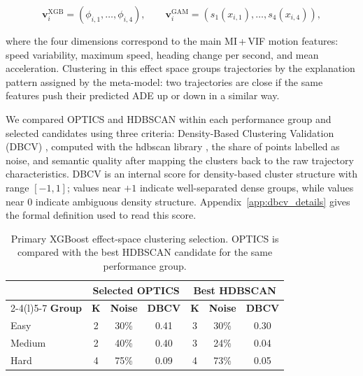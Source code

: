 \documentclass[12pt]{article}
\begin{document}
\begin{equation}
  \mathbf{v}^{\mathrm{XGB}}_i =
  \left(\phi_{i,1}, \ldots, \phi_{i,4}\right),
  \qquad
  \mathbf{v}^{\mathrm{GAM}}_i =
  \left(s_1(x_{i,1}), \ldots, s_4(x_{i,4})\right),
  \label{eq:cluster_effect_vectors}
\end{equation}

where the four dimensions correspond to the main MI\,+\,VIF motion features: speed variability, maximum speed, heading change per second, and mean acceleration. Clustering in this effect space groups trajectories by the explanation pattern assigned by the meta-model: two trajectories are close if the same features push their predicted ADE up or down in a similar way.

We compared OPTICS \citep{ankerst1999optics} and HDBSCAN \citep{campello2015hdbscan} within each performance group and selected candidates using three criteria: Density-Based Clustering Validation (DBCV) \citep{moulavi2014density}, computed with the hdbscan library \citep{mcinnes2017hdbscan}, the share of points labelled as noise, and semantic quality after mapping the clusters back to the raw trajectory characteristics. DBCV is an internal score for density-based cluster structure with range $[-1,1]$; values near $+1$ indicate well-separated dense groups, while values near $0$ indicate ambiguous density structure. Appendix~\ref{app:dbcv_details} gives the formal definition used to read this score.

\begin{table}[H]
  \centering
  
  \caption[Primary effect-space clustering selection]{Primary XGBoost effect-space clustering selection. OPTICS is compared with the best HDBSCAN candidate for the same performance group.}
  \label{tab:cluster_selection}
  \small
  \renewcommand{\arraystretch}{1.12}
  \begin{tabular}{lcccccc}
    \toprule
    & \multicolumn{3}{c}{\textbf{Selected OPTICS}} & \multicolumn{3}{c}{\textbf{Best HDBSCAN}} \\
    \cmidrule(lr){2-4}\cmidrule(l){5-7}
    \textbf{Group} & \textbf{K} & \textbf{Noise} & \textbf{DBCV} & \textbf{K} & \textbf{Noise} & \textbf{DBCV} \\
    \midrule
    Easy   & 2 & 30\% & 0.41 & 3 & 30\% & 0.30 \\
    Medium & 2 & 40\% & 0.40 & 3 & 24\% & 0.04 \\
    Hard   & 4 & 75\% & 0.09 & 4 & 73\% & 0.05 \\
    \bottomrule
  \end{tabular}
\end{table}
\end{document}
